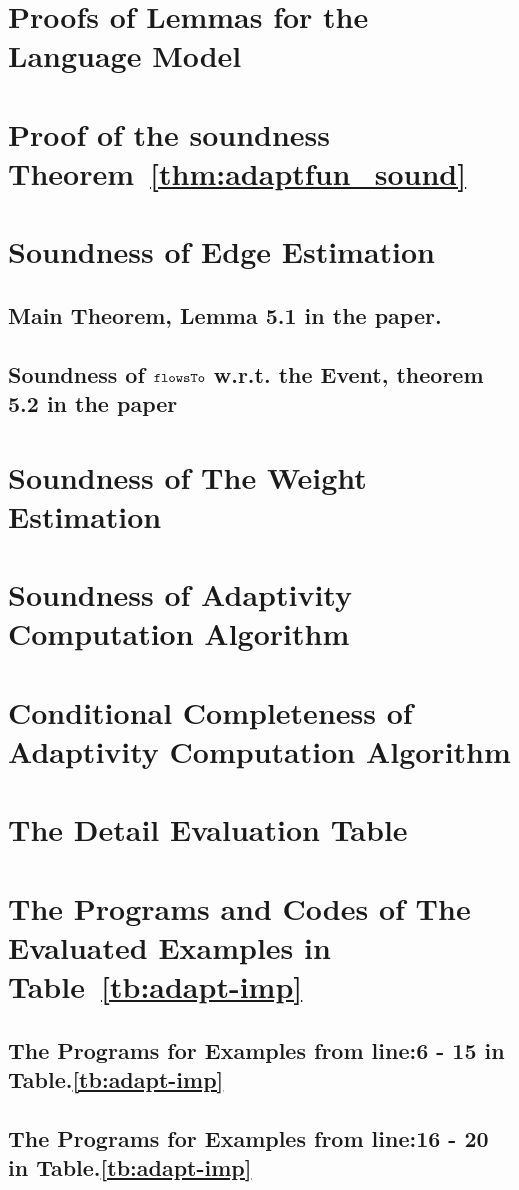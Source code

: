\section{Proofs of Lemmas for the Language Model}
\label{apdx:lemma_sec123}

\section{Proof of the soundness Theorem~\ref{thm:adaptfun_sound}}
\label{apdx:adapt_soundness}

\clearpage
\section{Soundness of Edge Estimation}
\label{apdx:flowsto_soundness}
\subsection{Main Theorem, Lemma 5.1 in the paper.}

%
\subsection{Soundness of $\mathtt{flowsTo}$ w.r.t. the Event, theorem 5.2 in the paper}
\label{apdx:flowsto_event_soundness}

\clearpage
\section{Soundness of The Weight Estimation}
\label{apdx:reachability_soundness}

\clearpage
\section{Soundness of Adaptivity Computation Algorithm}
\label{apdx:adaptalg_soundness}

\section{Conditional Completeness of Adaptivity Computation Algorithm}
\label{apdx:adaptalg_completeness}


\section{The Detail Evaluation Table}
\label{apdx:eval_table}

\section{The Programs and Codes of The Evaluated Examples in Table~\ref{tb:adapt-imp}}
\label{apdx:evaluated_examples}
\subsection{The Programs for Examples from line:6 - 15 in Table.\ref{tb:adapt-imp}}


\subsection{The Programs for Examples from line:16 - 20 in Table.\ref{tb:adapt-imp}}

